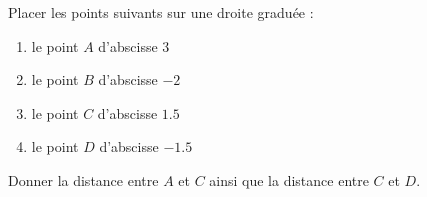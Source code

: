 
\begin{exercice}\label{exo2smath-0161}

Placer les points suivants sur une droite graduée :
\begin{multicols}{2}
\begin{enumerate}
    \item
        le point \( A\) d'abscisse \( 3\)
    \item
        le point \( B\) d'abscisse \( -2\)
    \item
        le point \( C\) d'abscisse \( 1.5\)
    \item
        le point \( D\) d'abscisse \( -1.5\)
\end{enumerate}
\end{multicols}
Donner la distance entre \( A\) et \( C\) ainsi que la distance entre \( C\) et \( D\).

\end{exercice}
